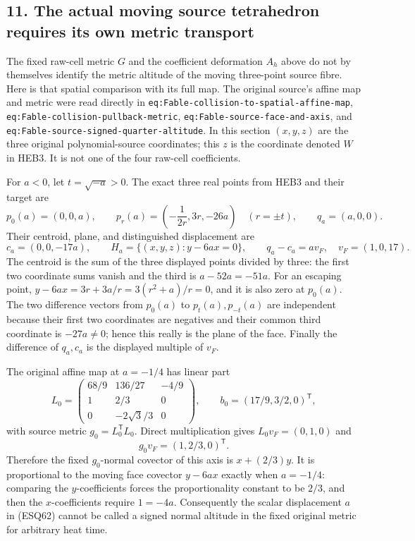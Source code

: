 \documentclass[
  10pt,
  a4paper,
]{article}
\begin{document}
\subsection{11. The actual moving source tetrahedron requires its own
metric
transport}\label{the-actual-moving-source-tetrahedron-requires-its-own-metric-transport}

The fixed raw-cell metric \(G\) and the coefficient deformation \(A_h\)
above do not by themselves identify the metric altitude of the moving
three-point source fibre. Here is that spatial comparison with its full
map. The original source's affine map and metric were read directly in
\texttt{eq:\allowbreak{}Fable-\allowbreak{}collision-\allowbreak{}to-\allowbreak{}spatial-\allowbreak{}affine-\allowbreak{}map},
\texttt{eq:\allowbreak{}Fable-\allowbreak{}collision-\allowbreak{}pullback-\allowbreak{}metric},
\texttt{eq:\allowbreak{}Fable-\allowbreak{}source-\allowbreak{}face-\allowbreak{}and-\allowbreak{}axis}, and
\texttt{eq:\allowbreak{}Fable-\allowbreak{}source-\allowbreak{}signed-\allowbreak{}quarter-\allowbreak{}altitude}. In this section
\((x,y,z)\) are the three original polynomial-source coordinates; this
\(z\) is the coordinate denoted \(W\) in HEB3. It is not one of the four
raw-cell coefficients.

For \(a<0\), let \(t=\sqrt{-a}>0\). The exact three real points from
HEB3 and their target are \[
p_0(a)=(0,0,a),\qquad
p_r(a)=\left(-\frac1{2r},3r,-26a\right)
\quad(r=\pm t),\qquad q_a=(a,0,0).
\tag{ESQ61}
\] Their centroid, plane, and distinguished displacement are \[
c_a=(0,0,-17a),\qquad
H_a=\{(x,y,z):y-6ax=0\},\qquad
q_a-c_a=a v_F,\quad v_F=(1,0,17).
\tag{ESQ62}
\] The centroid is the sum of the three displayed points divided by
three: the first two coordinate sums vanish and the third is
\(a-52a=-51a\). For an escaping point, \(y-6ax=3r+3a/r=3(r^2+a)/r=0\),
and it is also zero at \(p_0(a)\). The two difference vectors from
\(p_0(a)\) to \(p_t(a),p_{-t}(a)\) are independent because their first
two coordinates are negatives and their common third coordinate is
\(-27a\ne0\); hence this really is the plane of the face. Finally the
difference of \(q_a,c_a\) is the displayed multiple of \(v_F\).

The original affine map at \(a=-1/4\) has linear part \[
L_0=\begin{pmatrix}
68/9&136/27&-4/9\\
1&2/3&0\\
0&-2\sqrt3/3&0
\end{pmatrix},\qquad
b_0=(17/9,3/2,0)^{\mathsf T},
\tag{ESQ63}
\] with source metric \(g_0=L_0^{\mathsf T}L_0\). Direct multiplication
gives \(L_0v_F=(0,1,0)\) and \[
g_0v_F=(1,2/3,0)^{\mathsf T}.
\tag{ESQ64}
\] Therefore the fixed \(g_0\)-normal covector of this axis is
\(x+(2/3)y\). It is proportional to the moving face covector \(y-6ax\)
exactly when \(a=-1/4\): comparing the \(y\)-coefficients forces the
proportionality constant to be \(2/3\), and then the \(x\)-coefficients
require \(1=-4a\). Consequently the scalar displacement \(a\) in (ESQ62)
cannot be called a signed normal altitude in the fixed original metric
for arbitrary heat time.
\end{document}
